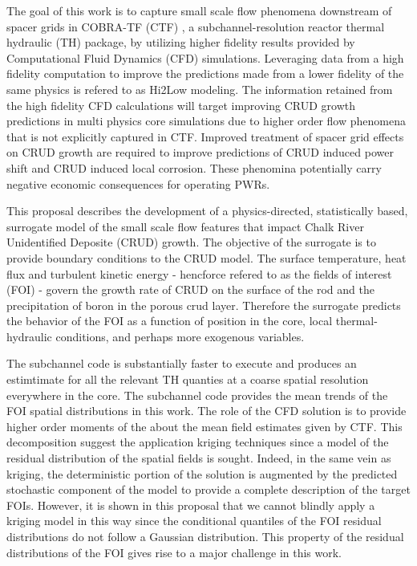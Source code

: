 The goal of this work is to capture small scale flow phenomena downstream of
spacer grids in COBRA-TF (CTF) \cite{salko12}, a subchannel-resolution reactor
thermal hydraulic (TH) package, by utilizing higher fidelity results provided
by Computational Fluid Dynamics (CFD) simulations.  Leveraging data from a high fidelity computation
to improve the predictions made from a lower fidelity of the same physics is refered to as Hi2Low modeling.  
The information retained from the high
fidelity CFD calculations will target improving CRUD growth predictions in
multi physics core simulations due to higher order flow phenomena that is not
explicitly captured in CTF.  
Improved treatment of spacer grid
effects on CRUD growth are required to improve predictions of CRUD induced power shift
and CRUD induced local corrosion.  These phenomina potentially carry negative economic consequences for
operating PWRs.

This proposal describes the development of a physics-directed, statistically
based, surrogate model of the small scale flow features that impact Chalk River Unidentified Deposite (CRUD)
growth.   
The objective of the surrogate is to provide boundary conditions to the CRUD
model.  The surface temperature, heat flux and
turbulent kinetic energy - hencforce refered to as the fields of interest (FOI) - govern the growth rate of CRUD on the surface
of the rod and the precipitation of boron in the porous crud layer.
Therefore the surrogate predicts the behavior of the FOI as a function
of position in the core, local thermal-hydraulic conditions, and perhaps 
more exogenous variables. 

The subchannel code is substantially faster to execute and produces an estimtimate for
all the relevant TH quanties at a coarse spatial resolution everywhere in the core. 
The subchannel code provides the mean trends of the 
FOI spatial distributions in this work.  The role of the CFD solution is to provide
higher order moments of the about the mean field estimates given by CTF.  This 
decomposition suggest the application kriging techniques since a model of the
residual distribution of the spatial fields is sought.  Indeed, in the same
vein as kriging, the deterministic portion of the solution is augmented by the
predicted stochastic component of the model to provide a complete description of
the target FOIs.  However, it is shown in this proposal that we cannot blindly
apply a kriging model in this way since the conditional quantiles of the FOI
residual distributions do not follow a Gaussian distribution.  This property of
the residual distributions of the FOI gives rise to a major challenge in this
work.


